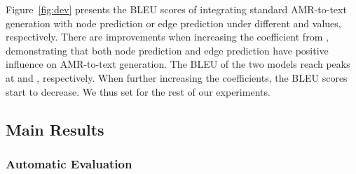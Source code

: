 \documentclass[11pt,a4paper]{article}
\begin{document}
Figure~\ref{fig:dev} presents the BLEU scores of integrating standard AMR-to-text generation with node prediction or edge prediction under different  and  values, respectively. 
There are improvements when increasing the coefficient from , demonstrating that both node prediction and edge prediction have positive influence on AMR-to-text generation. 
The BLEU of the two models reach peaks at  and , respectively. When further increasing the coefficients, the BLEU scores start to decrease.
We thus set  for the rest of our experiments. 
\subsection{Main Results}
\subsubsection{Automatic Evaluation}
\begin{table}
	\small
	\begin{center}
			\caption{Test-set BLEU scores on LDC2015E86 (LDC15) and LDC2017T10 (LDC17).}
			\label{tab:main}
\end{center}
\end{table}
\end{document}
